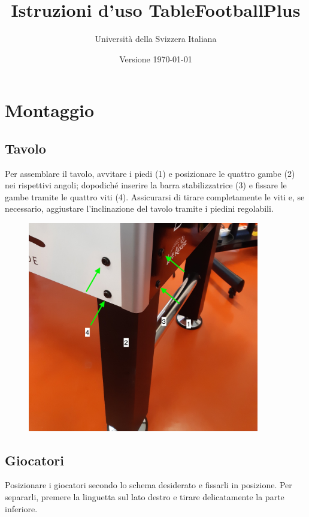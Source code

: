 \documentclass[12pt]{article}
\title{Istruzioni d'uso TableFootballPlus}
\author{Università della Svizzera Italiana}
\date{Versione \today}
\begin{document}
\maketitle
\tableofcontents
\newpage

\section{Montaggio}

	\subsection{Tavolo}
	
		Per assemblare il tavolo, avvitare i piedi (1) e posizionare le quattro gambe (2) nei rispettivi angoli; dopodiché inserire la barra stabilizzatrice (3) e fissare le gambe tramite le quattro viti (4). Assicurarsi di tirare completamente le viti e, se necessario, aggiustare l'inclinazione del tavolo tramite i piedini regolabili.

		\begin{figure}[H]
				\centering
                \includegraphics[width=0.9\textwidth]{img/screws.jpg}
        \end{figure}
        
        
      \subsection{Giocatori}
      
      Posizionare i giocatori secondo lo schema desiderato e fissarli in posizione. Per separarli, premere la linguetta sul lato destro e tirare delicatamente la parte inferiore.
      
\end{document}
